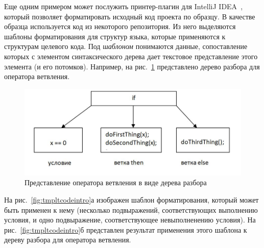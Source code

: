 
Еще одним примером может послужить принтер-плагин для IntelliJ IDEA~\cite{podkopaev:diploma1}, который позволяет форматировать исходный код проекта по образцу. 
В качестве образца используется код из некоторого репозитория. 
Из него выделяются шаблоны форматирования для структур языка, которые применяются к структурам целевого кода. 
Под \textit{шаблоном} понимаются данные, сопоставление которых с элементом синтаксического дерева дает текстовое представление этого элемента (и его потомков). 
Например, на рис.~\ref{fig:ifTree} представлено дерево разбора для оператора ветвления. 


\begin{figure}[h]
	\centering
	\includegraphics[width=\textwidth]{Ozernykh/images/ifTree.jpg}
	\caption{Представление оператора ветвления в виде дерева разбора}
	\label{fig:ifTree}
\end{figure}

На рис.~\ref{fig:tmpltcodeintro}а изображен шаблон форматирования, который может быть применен к нему (несколько подвыражений, соответствующих выполнению условия, и одно подвыражение, соответствующее невыполненению условия).
На рис.~\ref{fig:tmpltcodeintro}б представлен результат применения этого шаблона к дереву разбора для оператора ветвления.

% 	


